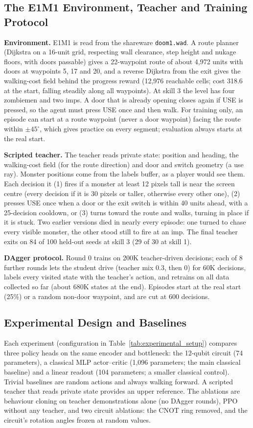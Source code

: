 \documentclass[10pt, a4paper]{article}
\begin{document}
\subsection{The E1M1 Environment, Teacher and Training Protocol}
\textbf{Environment.} E1M1 is read from the shareware \texttt{doom1.wad}. A route planner (Dijkstra on a 16-unit grid, respecting wall clearance, step height and nukage floors, with doors passable) gives a 22-waypoint route of about 4,972 units with doors at waypoints 5, 17 and 20, and a reverse Dijkstra from the exit gives the walking-cost field behind the progress reward (12,976 reachable cells; cost 318.6 at the start, falling steadily along all waypoints). At skill 3 the level has four zombiemen and two imps. A door that is already opening closes again if USE is pressed, so the agent must press USE once and then walk. For training only, an episode can start at a route waypoint (never a door waypoint) facing the route within $\pm45^{\circ}$, which gives practice on every segment; evaluation always starts at the real start.

\textbf{Scripted teacher.} The teacher reads private state: position and heading, the walking-cost field (for the route direction) and door and switch geometry (a use ray). Monster positions come from the labels buffer, as a player would see them. Each decision it (1) fires if a monster at least 12 pixels tall is near the screen centre (every decision if it is 30 pixels or taller, otherwise every other one), (2) presses USE once when a door or the exit switch is within 40 units ahead, with a 25-decision cooldown, or (3) turns toward the route and walks, turning in place if it is stuck. Two earlier versions died in nearly every episode: one turned to chase every visible monster, the other stood still to fire at an imp. The final teacher exits on 84 of 100 held-out seeds at skill 3 (29 of 30 at skill 1).

\textbf{DAgger protocol.} Round 0 trains on 200K teacher-driven decisions; each of 8 further rounds lets the student drive (teacher mix 0.3, then 0) for 60K decisions, labels every visited state with the teacher's action, and retrains on all data collected so far (about 680K states at the end). Episodes start at the real start (25\%) or a random non-door waypoint, and are cut at 600 decisions.

\subsection{Experimental Design and Baselines}
Each experiment (configuration in Table~\ref{tab:experimental_setup}) compares three policy heads on the same encoder and bottleneck: the 12-qubit circuit (74 parameters), a classical MLP actor--critic (1,096 parameters; the main classical baseline) and a linear readout (104 parameters; a smaller classical control). Trivial baselines are random actions and always walking forward. A scripted teacher that reads private state provides an upper reference. The ablations are behaviour cloning on teacher demonstrations alone (no DAgger rounds), PPO without any teacher, and two circuit ablations: the CNOT ring removed, and the circuit's rotation angles frozen at random values.
\end{document}
